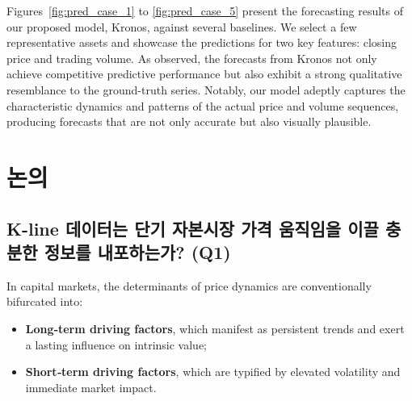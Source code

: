 Figures~\ref{fig:pred_case_1} to \ref{fig:pred_case_5} present the forecasting results of our proposed model, Kronos, against several baselines.
We select a few representative assets and showcase the predictions for two key features: closing price and trading volume.
As observed, the forecasts from Kronos not only achieve competitive predictive performance but also exhibit a strong qualitative resemblance to the ground-truth series.
Notably, our model adeptly captures the characteristic dynamics and patterns of the actual price and volume sequences, producing forecasts that are not only accurate but also visually plausible.

\section{논의}
\label{sec:discussion}


\subsection{K-line 데이터는 단기 자본시장 가격 움직임을 이끌 충분한 정보를 내포하는가? (Q1)}




In capital markets, the determinants of price dynamics are conventionally bifurcated into:

\begin{itemize}
\item \textbf{Long‐term driving factors}, which manifest as persistent trends and exert a lasting influence on intrinsic value;
\item \textbf{Short‐term driving factors}, which are typified by elevated volatility and immediate market impact.

\end{itemize}

